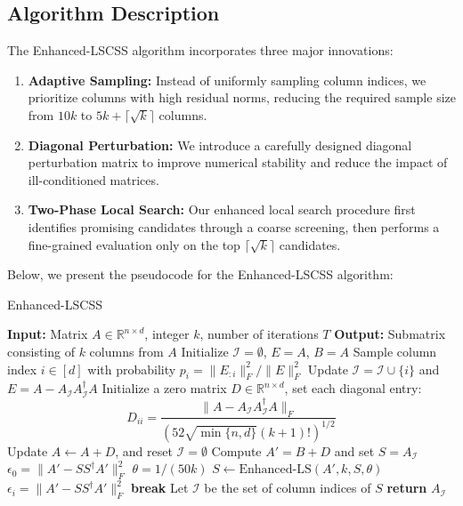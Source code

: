 \documentclass{article}
\begin{document}
\subsection{Algorithm Description}
The Enhanced-LSCSS algorithm incorporates three major innovations:

\begin{enumerate}
    \item \textbf{Adaptive Sampling:} Instead of uniformly sampling column indices, we prioritize columns with high residual norms, reducing the required sample size from $10k$ to $5k + \lceil\sqrt{k}\rceil$ columns.
    \item \textbf{Diagonal Perturbation:} We introduce a carefully designed diagonal perturbation matrix to improve numerical stability and reduce the impact of ill-conditioned matrices.
    \item \textbf{Two-Phase Local Search:} Our enhanced local search procedure first identifies promising candidates through a coarse screening, then performs a fine-grained evaluation only on the top $\lceil\sqrt{k}\rceil$ candidates.
\end{enumerate}

Below, we present the pseudocode for the Enhanced-LSCSS algorithm:

\begin{algorithm}[H]
\caption{Enhanced-LSCSS}
\label{alg:enhanced-lscss}
\begin{algorithmic}[1]
\STATE \textbf{Input:} Matrix $A \in \mathbb{R}^{n \times d}$, integer $k$, number of iterations $T$
\STATE \textbf{Output:} Submatrix consisting of $k$ columns from $A$
\STATE Initialize $\mathcal{I} = \emptyset$, $E = A$, $B = A$
        \STATE Sample column index $i \in [d]$ with probability $p_i = \|E_{:i}\|_F^2/\|E\|_F^2$
        \STATE Update $\mathcal{I} = \mathcal{I} \cup \{i\}$ and $E = A - A_{\mathcal{I}}A_{\mathcal{I}}^\dagger A$
    \ENDFOR
        \STATE Initialize a zero matrix $D \in \mathbb{R}^{n \times d}$, set each diagonal entry:
        \[
        D_{ii} = \frac{\|A - A_{\mathcal{I}}A_{\mathcal{I}}^\dagger A\|_F}{(52\sqrt{\min\{n,d\}}(k+1)!)^{1/2}}
        \]
        \STATE Update $A \leftarrow A + D$, and reset $\mathcal{I} = \emptyset$
    \ENDIF
\ENDFOR
\STATE Compute $A' = B + D$ and set $S = A_{\mathcal{I}}$
\STATE $\epsilon_0 = \|A' - SS^\dagger A'\|_F^2$
\STATE $\theta = 1/(50k)$ \hfill {}
    \STATE $S \leftarrow \text{Enhanced-LS}(A', k, S, \theta)$
    \STATE $\epsilon_i = \|A' - SS^\dagger A'\|_F^2$
        \STATE \textbf{break} \hfill {}
    \ENDIF
\ENDFOR
\STATE Let $\mathcal{I}$ be the set of column indices of $S$
\STATE \textbf{return} $A_{\mathcal{I}}$
\end{algorithmic}
\end{algorithm}
\end{document}
